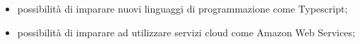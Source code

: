 \begin{itemize}
\item possibilità di imparare nuovi linguaggi di programmazione come  Typescript;
\item possibilità di imparare ad utilizzare servizi cloud come Amazon Web Services;
\end{itemize}